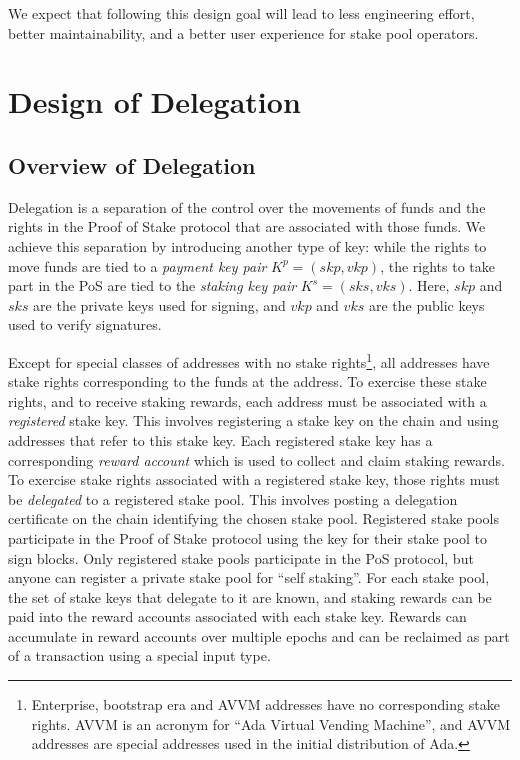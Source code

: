 \documentclass[11pt,a4paper,dvipsnames,twosided]{article}
\begin{document}
We expect that following this design goal will lead to less engineering
effort, better maintainability, and a better user experience for stake
pool operators.

\section{Design of Delegation}
\label{design-of-delegation}

\newcommand{\hash}[1]{\mathcal{H}(#1)}

\subsection{Overview of Delegation}
\label{overview-of-delegation}

Delegation is a separation of the control over the movements of funds
and the rights in the Proof of Stake protocol that are associated with
those funds. We achieve this separation by introducing another type of
key: while the rights to move funds are tied to a \emph{payment key
pair} \(K^p=(skp, vkp)\), the rights to take part in the PoS are tied to
the \emph{staking key pair} \(K^s=(sks, vks)\). Here, \(skp\) and
\(sks\) are the private keys used for signing, and \(vkp\) and \(vks\)
are the public keys used to verify signatures.

Except for special classes of addresses with no stake rights\footnote{Enterprise,
  bootstrap era and AVVM addresses have no corresponding stake
  rights. AVVM is an acronym for ``Ada Virtual Vending Machine'', and AVVM
  addresses are special addresses used in the initial distribution of Ada.}, all
addresses have stake rights corresponding to the funds
at the address. To exercise these stake rights, and to receive staking
rewards, each address must be associated with a \emph{registered} stake
key. This involves registering a stake key on the chain and using
addresses that refer to this stake key. Each registered stake key has a
corresponding \emph{reward account} which is used to collect and claim
staking rewards. To exercise stake rights associated with a registered
stake key, those rights must be \emph{delegated} to a registered stake pool.
This involves posting a delegation certificate on the chain identifying
the chosen stake pool. Registered stake pools participate in the Proof
of Stake protocol using the key for their stake pool to sign blocks.
Only registered stake pools participate in the PoS protocol, but anyone
can register a private stake pool for ``self staking''. For each stake
pool, the set of stake keys that delegate to it are known, and staking
rewards can be paid into the reward accounts associated with each stake
key. Rewards can accumulate in reward accounts over multiple epochs and
can be reclaimed as part of a transaction using a special input type.
\end{document}
